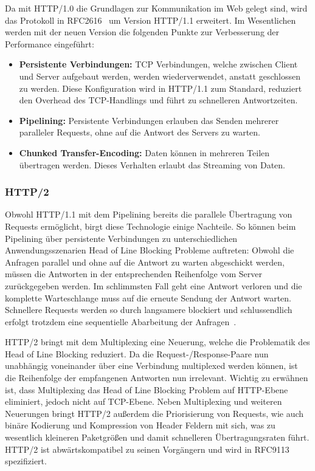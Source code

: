 Da mit HTTP/1.0 die Grundlagen zur Kommunikation im Web gelegt sind, wird das Protokoll in RFC2616~\cite{rfc2616} um Version HTTP/1.1 erweitert.
Im Wesentlichen werden mit der neuen Version die folgenden Punkte zur Verbesserung der Performance eingeführt:

\begin{itemize}
    \item \textbf{Persistente Verbindungen:} TCP Verbindungen, welche zwischen Client und Server aufgebaut werden, werden wiederverwendet, anstatt geschlossen zu werden.
    Diese Konfiguration wird in HTTP/1.1 zum Standard, reduziert den Overhead des TCP-Handlings und führt zu schnelleren Antwortzeiten.
    \item \textbf{Pipelining:} Persistente Verbindungen erlauben das Senden mehrerer paralleler Requests, ohne auf die Antwort des Servers zu warten.
    \item \textbf{Chunked Transfer-Encoding:} Daten können in mehreren Teilen übertragen werden.
    Dieses Verhalten erlaubt das Streaming von Daten.
\end{itemize}

\subsubsection{HTTP/2}

Obwohl HTTP/1.1 mit dem Pipelining bereits die parallele Übertragung von Requests ermöglicht, birgt diese Technologie einige Nachteile.
So können beim Pipelining über persistente Verbindungen zu unterschiedlichen Anwendungsszenarien Head of Line Blocking Probleme auftreten:
Obwohl die Anfragen parallel und ohne auf die Antwort zu warten abgeschickt werden, müssen die Antworten in der entsprechenden Reihenfolge vom Server zurückgegeben werden.
Im schlimmsten Fall geht eine Antwort verloren und die komplette Warteschlange muss auf die erneute Sendung der Antwort warten.
Schnellere Requests werden so durch langsamere blockiert und schlussendlich erfolgt trotzdem eine sequentielle Abarbeitung der Anfragen~\cite{7179400}.

HTTP/2 bringt mit dem Multiplexing eine Neuerung, welche die Problematik des Head of Line Blocking reduziert.
Da die Request-/Response-Paare nun unabhängig voneinander über eine Verbindung multiplexed werden können, ist die Reihenfolge der empfangenen Antworten nun irrelevant.
Wichtig zu erwähnen ist, dass Multiplexing das Head of Line Blocking Problem auf HTTP-Ebene eliminiert, jedoch nicht auf TCP-Ebene.
Neben Multiplexing und weiteren Neuerungen bringt HTTP/2 außerdem die Priorisierung von Requests, wie auch binäre Kodierung und Kompression von Header Feldern mit sich, was zu wesentlich kleineren Paketgrößen und damit schnelleren Übertragungsraten führt.
HTTP/2 ist abwärtskompatibel zu seinen Vorgängern und wird in RFC9113~\cite{rfc9113} spezifiziert.

